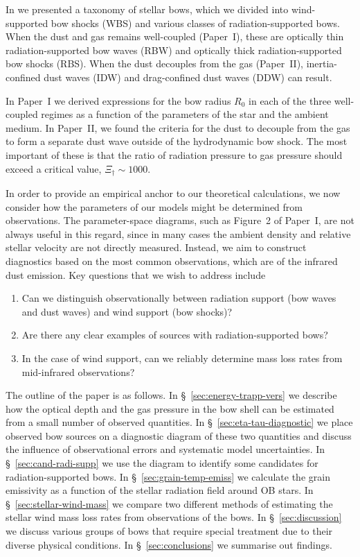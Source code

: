 \documentclass[useAMS, usenatbib, a4paper]{mnras}
\providecommand{\DIFaddtex}[1]{{\protect\color{red!70!black}\uwave{#1}}} %
\providecommand{\DIFaddbegin}{} %
\providecommand{\DIFaddend}{} %
\providecommand{\DIFadd}[1]{\texorpdfstring{\DIFaddtex{#1}}{#1}} %
\begin{document}
In \citet[Paper~I and Paper~II]{Henney:2019a, Henney:2019b} we
presented a taxonomy of stellar bows, which we divided into
wind-supported bow shocks (WBS) and various classes of
radiation-supported bows.  When the dust and gas remains well-coupled
(Paper~I), these are optically thin radiation-supported bow waves
(RBW) and optically thick radiation-supported bow shocks (RBS).  When
the dust decouples from the gas (Paper~II), inertia-confined dust
waves (IDW) and drag-confined dust waves (DDW) can result.

In Paper~I we derived expressions for the bow radius \(R_0\)
\DIFaddbegin \DIFadd{(star--apex distance) }\DIFaddend in each of the three well-coupled regimes as a
function of the parameters of the star and the ambient medium.  In
Paper~II, we found the criteria for the dust to decouple from the gas
to form a separate dust wave outside of the hydrodynamic bow shock.
The most important of these is that the ratio of radiation pressure to
gas pressure should exceed a critical value, \(\Xi_\dag \sim 1000\).

In order to provide an empirical anchor to our theoretical
calculations, we now consider how the parameters of our models might
be determined from observations.  The parameter-space diagrams, such
as Figure~2 of Paper~I, are not always useful in this regard, since in
many cases the ambient density and relative stellar velocity are not
directly measured.  Instead, we aim to construct diagnostics based on
the most common observations, which are of the infrared dust emission.
Key questions that we wish to address include
\begin{enumerate}[1.]
\item Can we distinguish observationally between radiation support
  (bow waves and dust waves) and wind support (bow shocks)?
\item Are there any clear examples of sources with radiation-supported bows?
\item In the case of wind support, can we reliably determine mass loss
  rates from mid-infrared observations?
\end{enumerate}

The outline of the paper is as follows. In
\S~\ref{sec:energy-trapp-vers} we describe how the optical depth and
the gas pressure in the bow shell can be estimated from a small number
of observed quantities.  In \S~\ref{sec:eta-tau-diagnostic} we place
observed bow sources on a diagnostic diagram of these two quantities
and discuss the influence of observational errors and systematic model
uncertainties. In \S~\ref{sec:cand-radi-supp} we use the diagram to
identify some candidates for radiation-supported bows. In
\S~\ref{sec:grain-temp-emiss} we calculate the grain emissivity as a
function of the stellar radiation field around OB stars.  In
\S~\ref{sec:stellar-wind-mass} we compare two different methods of
estimating the stellar wind mass loss rates from observations of the
bows. In \S~\ref{sec:discussion} we discuss various groups of bows
that require special treatment due to their diverse physical
conditions. In \S~\ref{sec:conclusions} we summarise out findings.
\end{document}
